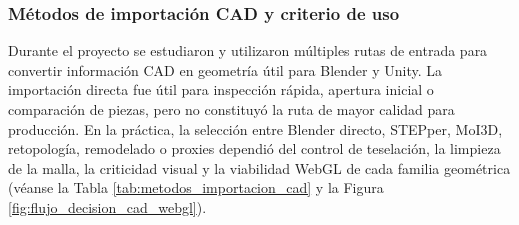 \subsubsection{Métodos de importación CAD y criterio de uso}

Durante el proyecto se estudiaron y utilizaron múltiples rutas de entrada para convertir información CAD en geometría útil para Blender y Unity. La importación directa fue útil para inspección rápida, apertura inicial o comparación de piezas, pero no constituyó la ruta de mayor calidad para producción. En la práctica, la selección entre Blender directo, STEPper, MoI3D, retopología, remodelado o proxies dependió del control de teselación, la limpieza de la malla, la criticidad visual y la viabilidad WebGL de cada familia geométrica (véanse la Tabla \ref{tab:metodos_importacion_cad} y la Figura \ref{fig:flujo_decision_cad_webgl}).

